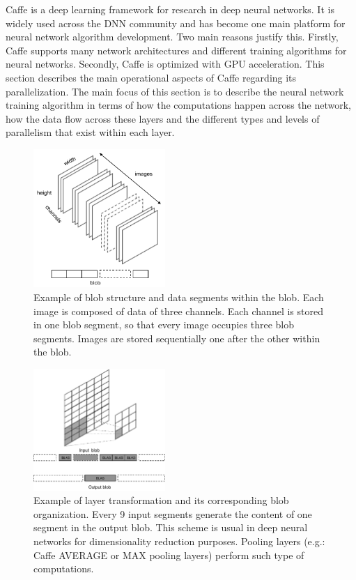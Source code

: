 Caffe is a deep learning framework for research in deep neural
networks. It is widely used across the DNN community
and has become one main platform for neural network algorithm development. 
Two main reasons justify this. Firstly, Caffe supports
many network architectures and different training algorithms for
neural networks. Secondly, Caffe is optimized with GPU acceleration.
This section describes the main operational aspects of Caffe
regarding its parallelization. 
The main focus of this section is to describe the neural network 
training algorithm in terms of how the computations happen across 
the network, how the data flow across these layers 
and the different types and levels of parallelism that exist within each layer.

\begin{figure}[]
\centering
\includegraphics[width=5cm]{figures/blob1.pdf}
\caption{Example of blob structure and data segments within the blob. Each image is composed of data of three channels. Each channel is stored in one blob segment, so that every image occupies three blob segments. Images are stored sequentially one after the other within the blob.}
\label{fig-blob}
\end{figure}
\begin{figure}[]
\centering
\includegraphics[width=5cm]{figures/blob2.pdf}
\caption{Example of layer transformation and its corresponding blob organization. Every 9 input segments generate the content of one segment in the output blob. This scheme is usual in deep neural networks for dimensionality reduction purposes. Pooling layers (e.g.: Caffe AVERAGE or MAX pooling layers) perform such type of computations.}
\label{fig-blob-trans}
\end{figure}

